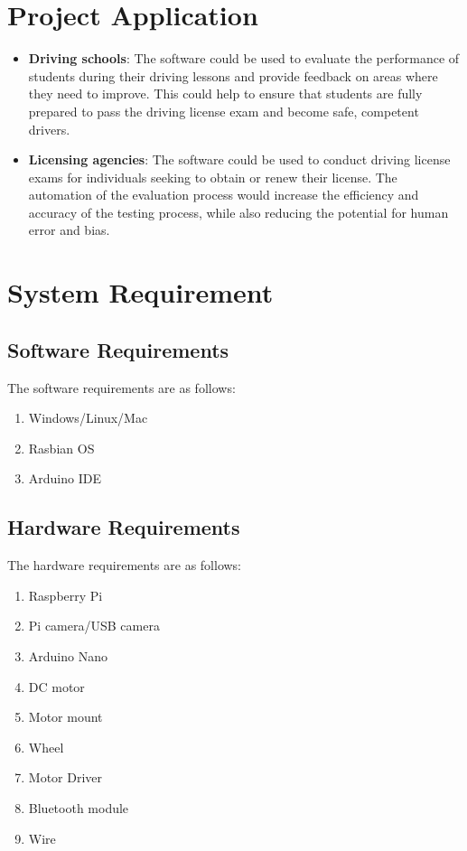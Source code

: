 \section{Project Application}
\vspace{-18pt}
\begin{itemize}
\item \textbf{Driving schools}: The software could be used to evaluate the performance of students during their driving lessons and provide feedback on areas where they need to improve. This could help to ensure that students are fully prepared to pass the driving license exam and become safe, competent drivers.
\item \textbf{Licensing agencies}: The software could be used to conduct driving license exams for individuals seeking to obtain or renew their license. The automation of the evaluation process would increase the efficiency and accuracy of the testing process, while also reducing the potential for human error and bias.
\end{itemize}

\section{System Requirement}
\vspace{-18pt}
\subsection{Software Requirements}
The software requirements are as follows:
\begin{enumerate}
\item Windows/Linux/Mac
\item Rasbian OS
\item Arduino IDE
\end{enumerate}

\subsection{Hardware Requirements}
The hardware requirements are as follows:
\begin{enumerate}
\item Raspberry Pi
\item Pi camera/USB camera
\item Arduino Nano
\item DC motor
\item Motor mount
\item Wheel
\item Motor Driver
\item Bluetooth module
\item Wire
\end{enumerate}
\label{tblSampleTable}

